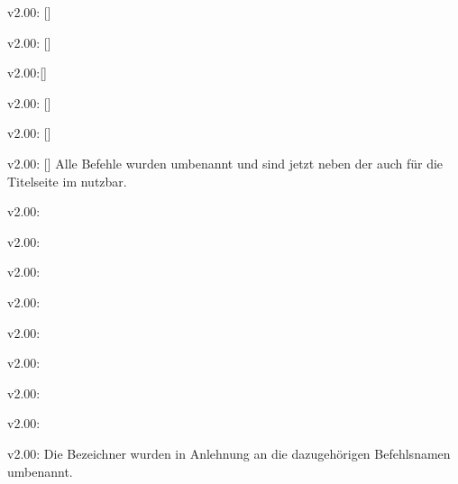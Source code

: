 \begin{Entity}{}
\begin{Cessation}{v2.00:}{%
  []%
}
\begin{Cessation}{v2.00:}{%
  []%
}
\begin{Cessation}{v2.00:}{[]}
\begin{Cessation}{v2.00:}{%
  []%
}
\begin{Cessation}{v2.00:}{%
  []%
}
\begin{Cessation}{v2.00:}{%
  []%
}
\printobsoletelist%
%
Alle Befehle wurden umbenannt und sind jetzt neben der \taskname{} auch für die 
Titelseite im \CD nutzbar.
\end{Cessation}
\end{Cessation}
\end{Cessation}
\end{Cessation}
\end{Cessation}
\end{Cessation}

\begin{Cessation}{v2.00:}{}
\begin{Cessation}{v2.00:}{}
\begin{Cessation}{v2.00:}{}
\begin{Cessation}{v2.00:}{}
\begin{Cessation}{v2.00:}{}
\begin{Cessation}{v2.00:}{}
\begin{Cessation}{v2.00:}{}
\begin{Cessation}{v2.00:}{}
\begin{Cessation}{v2.00:}{}
\printobsoletelist%
%
Die Bezeichner wurden in Anlehnung an die dazugehörigen Befehlsnamen umbenannt.
\end{Cessation}
\end{Cessation}
\end{Cessation}
\end{Cessation}
\end{Cessation}
\end{Cessation}
\end{Cessation}
\end{Cessation}
\end{Cessation}
\end{Entity}


